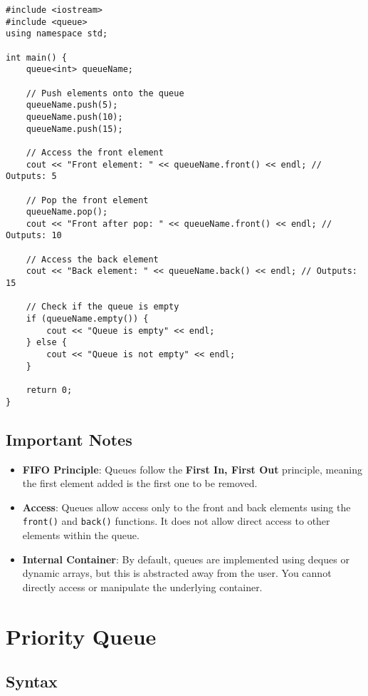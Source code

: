 \documentclass{article}
\begin{document}
\begin{lstlisting}
#include <iostream>
#include <queue>
using namespace std;

int main() {
    queue<int> queueName;
    
    // Push elements onto the queue
    queueName.push(5);
    queueName.push(10);
    queueName.push(15);
    
    // Access the front element
    cout << "Front element: " << queueName.front() << endl; // Outputs: 5
    
    // Pop the front element
    queueName.pop();
    cout << "Front after pop: " << queueName.front() << endl; // Outputs: 10
    
    // Access the back element
    cout << "Back element: " << queueName.back() << endl; // Outputs: 15
    
    // Check if the queue is empty
    if (queueName.empty()) {
        cout << "Queue is empty" << endl;
    } else {
        cout << "Queue is not empty" << endl;
    }
    
    return 0;
}
\end{lstlisting}

\subsection{Important Notes}

\begin{itemize}
    \item \textbf{FIFO Principle}: Queues follow the \textbf{First In, First Out} principle, meaning the first element added is the first one to be removed.
    \item \textbf{Access}: Queues allow access only to the front and back elements using the \texttt{front()} and \texttt{back()} functions. It does not allow direct access to other elements within the queue.
    \item \textbf{Internal Container}: By default, queues are implemented using deques or dynamic arrays, but this is abstracted away from the user. You cannot directly access or manipulate the underlying container.
\end{itemize}

\newpage
\section{Priority Queue}

\subsection{Syntax}
\end{document}
